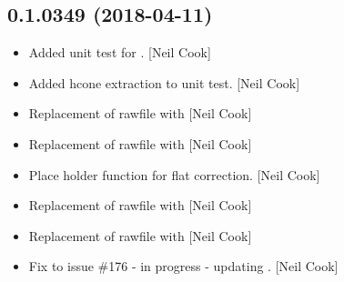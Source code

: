 \documentclass[a4paper,10pt,english]{report}
\begin{document}
\subsection{0.1.0349 (2018-04-11)}
\label{\detokenize{misc/changelog:id464}}\begin{itemize}
\item {} 
Added unit test for . {[}Neil Cook{]}

\item {} 
Added hcone extraction to unit test. {[}Neil Cook{]}

\item {} 
Replacement of rawfile with  {[}Neil Cook{]}

\item {} 
Replacement of rawfile with  {[}Neil Cook{]}

\item {} 
Place holder function for flat correction. {[}Neil Cook{]}

\item {} 
Replacement of rawfile with  {[}Neil Cook{]}

\item {} 
Replacement of rawfile with  {[}Neil Cook{]}

\item {} 
Fix to issue \#176 - in progress - updating . {[}Neil Cook{]}

\end{itemize}
\end{document}
